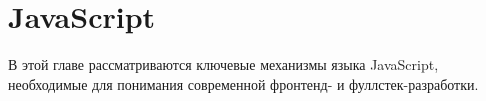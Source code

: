 \chapter{JavaScript}

В этой главе рассматриваются ключевые механизмы языка JavaScript,
необходимые для понимания современной фронтенд- и фуллстек-разработки.


